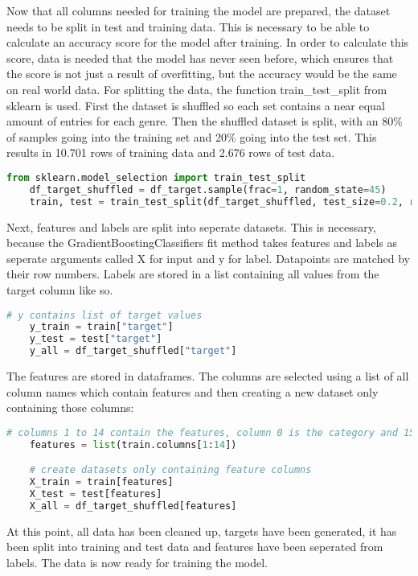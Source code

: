 Now that all columns needed for training the model are prepared, the dataset needs to be split in 
test and training data. This is necessary to be able to calculate an accuracy score for the model after training.
In order to calculate this score, data is needed that the model has never seen before, which ensures that 
the score is not just a result of overfitting, but the accuracy would be the same on real world data.
For splitting the data, the function train\_test\_split from sklearn is used.
First the dataset is shuffled so each set contains a near equal amount of entries for each genre.
Then the shuffled dataset is split, with an 80\% of samples going into the training set and 20\% going 
into the test set. This results in 10.701 rows of training data and 2.676 rows of test data.

\begin{lstlisting}[language=Python]
    from sklearn.model_selection import train_test_split
    df_target_shuffled = df_target.sample(frac=1, random_state=45)
    train, test = train_test_split(df_target_shuffled, test_size=0.2, random_state=45, shuffle=False)
\end{lstlisting}

Next, features and labels are split into seperate datasets. This is necessary, because the GradientBoostingClassifiers
fit method takes features and labels as seperate arguments called X for input and y for label. Datapoints are matched by their row numbers.
Labels are stored in a list containing all values from the target column like so.

\begin{lstlisting}[language=Python]
    # y contains list of target values
    y_train = train["target"]
    y_test = test["target"]
    y_all = df_target_shuffled["target"]
\end{lstlisting}

The features are stored in dataframes. The columns are selected using a list of all column names which contain features
and then creating a new dataset only containing those columns:

\begin{lstlisting}[language=Python]
    # columns 1 to 14 contain the features, column 0 is the category and 15 the target
    features = list(train.columns[1:14])

    # create datasets only containing feature columns
    X_train = train[features]
    X_test = test[features]
    X_all = df_target_shuffled[features]
\end{lstlisting}

At this point, all data has been cleaned up, targets have been generated, it has been split into training and test data and
features have been seperated from labels. The data is now ready for training the model.